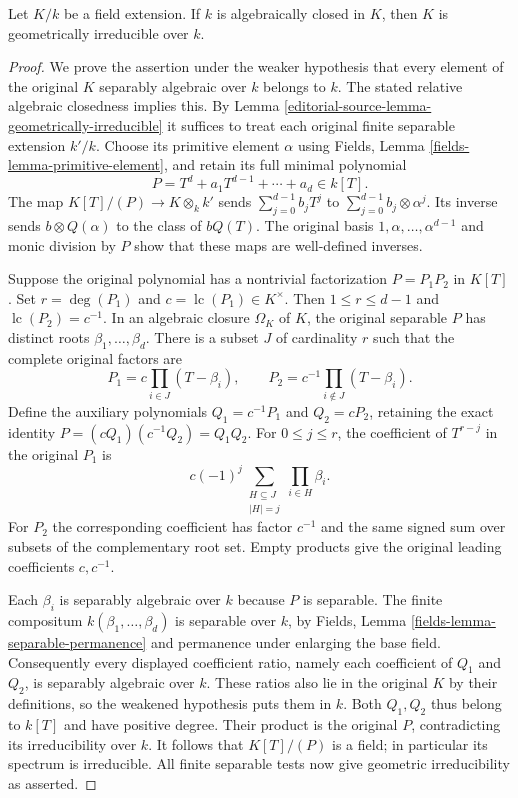 \begin{lemma}
\label{editorial-source-lemma-field-extension-geometrically-irreducible}
Let $K/k$ be a field extension. If $k$ is algebraically closed in $K$, then
$K$ is geometrically irreducible over $k$.
\end{lemma}

\begin{proof}
We prove the assertion under the weaker
hypothesis that every element of the
original $K$ separably algebraic over
$k$ belongs to $k$. The stated relative
algebraic closedness implies this.
By Lemma \ref{editorial-source-lemma-geometrically-irreducible}
it suffices to treat each original
finite separable extension $k'/k$.
Choose its primitive element $\alpha$
using Fields, Lemma
\ref{fields-lemma-primitive-element},
and retain its full minimal polynomial
$$
P=T^d+a_1T^{d-1}+\cdots+a_d\in k[T].
$$
The map $K[T]/(P)\to K\otimes_k k'$
sends $\sum_{j=0}^{d-1}b_jT^j$ to
$\sum_{j=0}^{d-1}b_j\otimes\alpha^j$.
Its inverse sends $b\otimes Q(\alpha)$
to the class of $bQ(T)$.
The original basis $1,\alpha,\ldots,\alpha^{d-1}$
and monic division by $P$ show that
these maps are well-defined inverses.

Suppose the original polynomial has
a nontrivial factorization $P=P_1P_2$
in $K[T]$. Set $r=\deg(P_1)$ and
$c=\operatorname{lc}(P_1)\in K^\times$.
Then $1\leq r\leq d-1$ and
$\operatorname{lc}(P_2)=c^{-1}$.
In an algebraic closure $\Omega_K$ of
$K$, the original separable $P$ has
distinct roots $\beta_1,\ldots,\beta_d$.
There is a subset $J$ of cardinality
$r$ such that the complete original
factors are
$$
P_1=c\prod_{i\in J}(T-\beta_i),\qquad
P_2=c^{-1}\prod_{i\notin J}(T-\beta_i).
$$
Define the auxiliary polynomials
$Q_1=c^{-1}P_1$ and $Q_2=cP_2$,
retaining the exact identity
$P=(cQ_1)(c^{-1}Q_2)=Q_1Q_2$.
For $0\leq j\leq r$, the coefficient
of $T^{r-j}$ in the original $P_1$ is
$$
c(-1)^j\sum_{\substack{H\subseteq J\\|H|=j}}
\prod_{i\in H}\beta_i.
$$
For $P_2$ the corresponding coefficient
has factor $c^{-1}$ and the same signed
sum over subsets of the complementary
root set. Empty products give the
original leading coefficients $c,c^{-1}$.

Each $\beta_i$ is separably algebraic
over $k$ because $P$ is separable.
The finite compositum $k(\beta_1,\ldots,\beta_d)$
is separable over $k$, by Fields,
Lemma \ref{fields-lemma-separable-permanence}
and permanence under enlarging the
base field. Consequently every displayed
coefficient ratio, namely each coefficient
of $Q_1$ and $Q_2$, is separably algebraic
over $k$. These ratios also lie in
the original $K$ by their definitions,
so the weakened hypothesis puts them
in $k$. Both $Q_1,Q_2$ thus belong to
$k[T]$ and have positive degree.
Their product is the original $P$,
contradicting its irreducibility over $k$.
It follows that $K[T]/(P)$ is a field;
in particular its spectrum is irreducible.
All finite separable tests now give
geometric irreducibility as asserted.


\end{proof}
